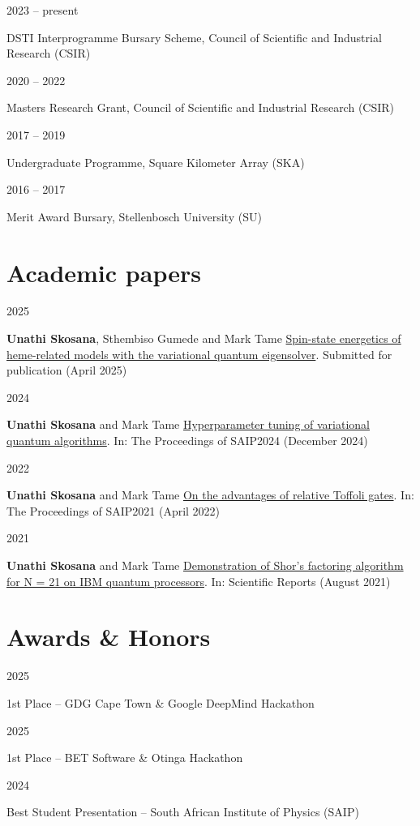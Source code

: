 \documentclass[9pt]{extreport}
\newcommand{\entry}[2]{%
  \noindent%
  \begin{minipage}[t]{2.25cm}%
    \raggedright #1%
  \end{minipage}%
  \hspace{0.4cm}%
  \begin{minipage}[t]{\dimexpr\textwidth-2cm\relax}%
    #2%
  \end{minipage}%
  \vspace{0.25cm}%
}
\begin{document}
\entry{2023 -- present}{DSTI Interprogramme Bursary Scheme, Council of Scientific and Industrial Research (CSIR)}

\entry{2020 -- 2022}{Masters Research Grant, Council of Scientific and Industrial Research (CSIR)}


\entry{2017 -- 2019}{Undergraduate Programme, Square Kilometer Array (SKA)}

\entry{2016 -- 2017}{Merit Award Bursary, Stellenbosch University (SU)}

\newpage 

\section*{Academic papers}

\entry{2025}{\textbf{Unathi Skosana}, Sthembiso Gumede and Mark Tame \href{https://arxiv.org/abs/2504.08494}{Spin-state energetics of heme-related models with the variational quantum eigensolver}. Submitted for publication (April 2025)}

\entry{2024}{\textbf{Unathi Skosana} and Mark Tame \href{https://events.saip.org.za/event/246/page/666-the-proceedings-of-saip2024}{Hyperparameter tuning of variational quantum algorithms}. In: The Proceedings of SAIP2024 (December 2024)}

\entry{2022}{\textbf{Unathi Skosana} and Mark Tame \href{https://events.saip.org.za/event/206/page/446-the-proceedings-of-saip2021}{On the advantages of relative Toffoli gates}. In: The Proceedings of SAIP2021 (April 2022)}

\entry{2021}{\textbf{Unathi Skosana} and Mark Tame \href{https://doi.org/10.1038/s41598-021-95973-w}{Demonstration of Shor's factoring algorithm for N = 21 on IBM quantum processors}. In: Scientific Reports (August 2021)}

\section*{Awards \& Honors}

\entry{2025}{1st Place -- GDG Cape Town \& Google DeepMind Hackathon}

\entry{2025}{1st Place -- BET Software \& Otinga Hackathon}

\entry{2024}{Best Student Presentation -- South African Institute of Physics (SAIP)}
\end{document}
